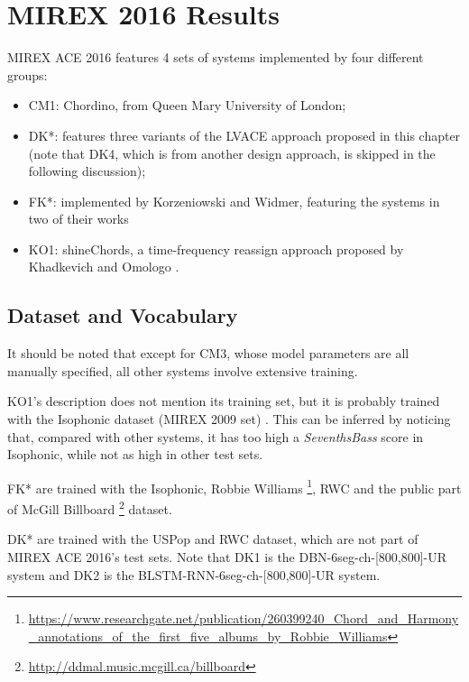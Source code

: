 \section{MIREX 2016 Results}
MIREX ACE 2016 features 4 sets of systems implemented by four different groups:
\begin{itemize}
\item CM1: Chordino, from Queen Mary University of London;
\item DK*: features three variants of the LVACE approach proposed in this chapter \cite{deng2016mirex} (note that DK4, which is from another design approach, is skipped in the following discussion);
\item FK*: implemented by Korzeniowski and Widmer, featuring the systems in two of their works \cite{Korzeniowski2016feature,Korzeniowski2016convolutional}
\item KO1: shineChords, a time-frequency reassign approach proposed by Khadkevich and Omologo \cite{khadkevich2011time}.
\end{itemize}

\subsection{Dataset and Vocabulary}
It should be noted that except for CM3, whose model parameters are all manually specified, all other systems involve extensive training.

KO1's description does not mention its training set, but it is probably trained with the Isophonic dataset (MIREX 2009 set) \cite{burgoyne2014comparative}. This can be inferred by noticing that, compared with other systems, it has too high a \textit{SeventhsBass} score in Isophonic, while not as high in other test sets.

FK* are trained with the Isophonic, Robbie Williams \footnote{\url{https://www.researchgate.net/publication/260399240\_Chord\_and\_Harmony\_annotations\_of\_the\_first\_five\_albums\_by\_Robbie\_Williams}}, RWC and the public part of McGill Billboard \footnote{\url{http://ddmal.music.mcgill.ca/billboard}} dataset.

DK* are trained with the USPop and RWC dataset, which are not part of MIREX ACE 2016's test sets. Note that DK1 is the DBN-6seg-ch-[800,800]-UR system and DK2 is the BLSTM-RNN-6seg-ch-[800,800]-UR system.

